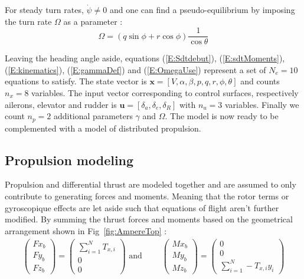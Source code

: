 For steady turn rates, $\dot{\psi}\neq0$ and one can find a pseudo-equilibrium by imposing the turn rate $\Omega$ as a parameter :
\begin{equation}
\Omega = \left( q \sin \phi + r \cos \phi \right) \frac{1}{\cos \theta} \label{E:OmegaUse}
\end{equation}

Leaving the heading angle aside, equations (\ref{E:Sdtdebut}), (\ref{E:sdtMoments}), (\ref{E:kinematics}), (\ref{E:gammaDef}) and (\ref{E:OmegaUse}) represent a set of $N_e=10$ equations to satisfy. The state vector is $\textbf{x}=[V,\alpha,\beta,p,q,r,\phi,\theta]$ and counts $n_x=8$ variables. The input vector corresponding to control surfaces, respectively ailerons, elevator and rudder is $\textbf{u}=[\delta_a, \delta_e, \delta_R]$ with $n_u=3$ variables. Finally we count $n_p=2$ additional parameters $\gamma$ and $\Omega$. The model is now ready to be complemented with a model of distributed propulsion.

\subsection{Propulsion modeling}

Propulsion and differential thrust are modeled together and are assumed to only contribute to generating forces and moments. Meaning that the rotor terms or gyroscopique effects are let aside such that equations of flight aren't further modified.
By summing the thrust forces and moments based on the geometrical arrangement shown in Fig~\ref{fig:AmpereTop} :
\begin{align}
\begin{pmatrix}
Fx_b\\
Fy_b\\
Fz_b
\end{pmatrix}
=
\begin{pmatrix}
\sum_{i=1}^{N} T_{x,i}\\
0\\
0
\end{pmatrix}
\text{ and }
\qquad
\begin{pmatrix}
Mx_b\\
My_b\\
Mz_b
\end{pmatrix}
=\begin{pmatrix}
0\\
0\\
\sum_{i=1}^{N} -T_{x,i} y_i
\end{pmatrix}
\end{align}

